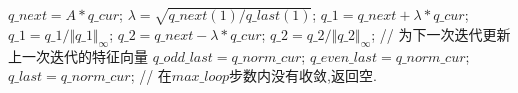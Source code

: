 \documentclass[12pt,a4paper,utf8]{ctexart}
\begin{document}
\begin{enumerate}
\begin{itemize}
\begin{algorithm}
\begin{algorithmic}[1]
                        \State $q\_next = A * q\_cur$;
                         $\lambda = \sqrt{ q\_next(1) / q\_last(1) }$;
                        \State $q\_1 = q\_next + \lambda * q\_cur$;
                         $q\_1 = q\_1 / {\Vert q\_1 \Vert}_{\infty}$;
                        \State $q\_2 = q\_next - \lambda * q\_cur$;
                        $q\_2 = q\_2 / {\Vert q\_2 \Vert}_{\infty}$;
                        \State {}
                    \EndIf
                    \State // 为下一次迭代更新上一次迭代的特征向量
                        $q\_odd\_last = q\_norm\_cur$;
                    \Else{}
                        $q\_even\_last = q\_norm\_cur$;
                    \EndIf
                    \State $ q\_last = q\_norm\_cur$;
                \EndFor 
                \State {} // 在$max\_loop$步数内没有收敛,返回空.
            \EndFunction  
        \end{algorithmic}  
    \end{algorithm}  
    

\end{itemize}
\end{enumerate}
\end{document}

